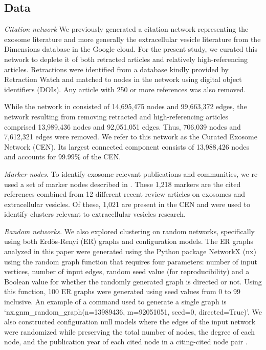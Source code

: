 \documentclass[12pt, oneside]{article}   	%
\begin{document}
	



\subsection{Data} 


\emph{Citation network} We previously generated a citation network \citep{Wedell2022} representing the exosome literature and more generally the extracellular vesicle literature \citep{harding1983,raposo2021} from the Dimensions database \citep{hook2018dimensions} in the Google cloud. For the present study, we curated this network to deplete it of both retracted articles and relatively high-referencing articles. Retractions were identified from a database kindly provided by Retraction Watch \citep{rw2022} and matched to nodes in the network using digital object identifiers (DOIs). Any article with 250 or more references was also removed. 

While the network in \cite{Wedell2022} consisted of 14,695,475 nodes and 99,663,372 edges, the network resulting from removing retracted and high-referencing articles comprised 13,989,436 nodes and 92,051,051 edges. Thus, 706,039 nodes and 7,612,321 edges were removed. We refer to this network as the Curated Exosome Network (CEN). Its largest connected component consists of 13,988,426 nodes and accounts for 99.99\% of the CEN.
	
\emph{Marker nodes}. To identify exosome-relevant publications and communities, we re-used a set of marker nodes described in  \cite{Wedell2022}. These 1,218 markers are the cited references combined from 12 different recent review articles on exosomes and extracellular vesicles. Of these, 1,021 are present in the CEN and  were used to identify clusters relevant to extracellular vesicles research.


\emph{Random networks.}
We also explored clustering on random networks, specifically using both Erd\H{o}s-Renyi (ER) graphs and configuration models.  The
ER graphs  analyzed in this paper were generated using the Python package NetworkX (nx) using the random graph function that requires four parameters: number of input vertices, number of input edges, random seed value (for reproducibility) and a Boolean value for whether the randomly generated graph is directed or not. Using this function, 100 ER graphs were generated using seed values from 0 to 99 inclusive. An example of a command used to generate a single graph is  `nx.gnm\_random\_graph(n=13989436, m=92051051, seed=0, directed=True)'. 
We also constructed configuration null models where the edges of the input network were randomized while preserving the total number of nodes, the degree of each node,  and the publication year of each cited node in a citing-cited node pair \citep{bradley2020}. 
 
\end{document}
